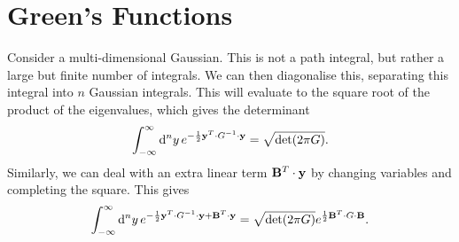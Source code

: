 \section{Green's Functions}%
\label{sec:green_s_functions}

Consider a multi-dimensional Gaussian. This is not a path integral, but rather a large but finite number of integrals.
We can then diagonalise this, separating this integral into $n$ Gaussian integrals. This will evaluate to the square root of the product of the eigenvalues, which gives the determinant
\begin{equation}
  \int_{-\infty}^{\infty} \dd[n]{y} e^{-\frac{1}{2} \vb{y}^T \cdot G^{-1} \cdot \vb{y}} = \sqrt{\det(2\pi G)}.
\end{equation}
Similarly, we can deal with an extra linear term $\vb{B}^T \cdot \vb{y}$ by changing variables and completing the square. This gives
\begin{equation}
  \int_{-\infty}^{\infty} \dd[n]{y} e^{-\frac{1}{2} \vb{y}^T \cdot G^{-1} \cdot \vb{y} + \vb{B}^T \cdot \vb{y}} = \sqrt{\det(2\pi G)} e^{\frac{1}{2} \vb{B}^T \cdot G \cdot \vb{B}}.
\end{equation}

